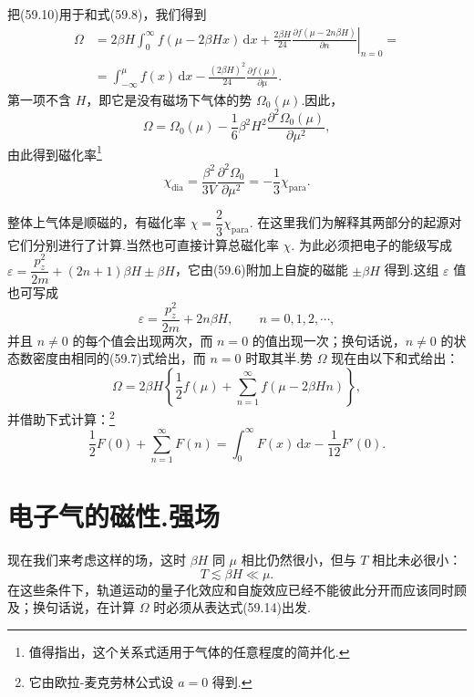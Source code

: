 把(59.10)用于和式(59.8)，我们得到
\begin{equation*}
\begin{aligned}
  \Omega&=2\beta H\int_0^{\infty}f(\mu-2\beta Hx)\,\mathrm{d}x
  +\frac{2\beta H}{24}\left.\frac{\partial f(\mu-2n\beta H)}{\partial n}\right|_{n=0}=\\
  &=\int_{-\infty}^{\mu}f(x)\,\mathrm{d}x
  -\frac{(2\beta H)^2}{24}\frac{\partial f(\mu)}{\partial\mu}.
\end{aligned}
\end{equation*}
第一项不含 $H$，即它是没有磁场下气体的势 $\Omega_0(\mu)$.因此，
\begin{equation}
  \Omega=\Omega_0(\mu)-\frac{1}{6}\beta^2H^2
  \frac{\partial^2\Omega_0(\mu)}{\partial\mu^2},
\end{equation}
由此得到磁化率\footnote{值得指出，这个关系式适用于气体的任意程度的简并化.}
\begin{equation}
  \chi_{\mathrm{dia}}=\frac{\beta^2}{3V}\frac{\partial^2\Omega_0}{\partial\mu^2}
  =-\frac{1}{3}\chi_{\mathrm{para}}.
\end{equation}

整体上气体是顺磁的，有磁化率 $\chi=\dfrac{2}{3}\chi_{\mathrm{para}}$. 在这里我们为解释其两部分的起源对它们分别进行了计算.当然也可直接计算总磁化率 $\chi$. 为此必须把电子的能级写成 $\varepsilon=\dfrac{p_z^2}{2m}+(2n+1)\beta H\pm\beta H$，它由(59.6)附加上自旋的磁能 $\pm\beta H$ 得到.这组 $\varepsilon$ 值也可写成
\begin{equation}
  \varepsilon=\frac{p_z^2}{2m}+2n\beta H,\qquad n=0,1,2,\cdots,
\end{equation}
并且 $n\neq0$ 的每个值会出现两次，而 $n=0$ 的值出现一次；换句话说，$n\neq0$ 的状态数密度由相同的(59.7)式给出，而 $n=0$ 时取其半.势 $\Omega$ 现在由以下和式给出：
\begin{equation}
  \Omega=2\beta H\left\{\frac{1}{2}f(\mu)+\sum_{n=1}^{\infty}f(\mu-2\beta Hn)\right\},
\end{equation}
并借助下式计算：\footnote{它由欧拉-麦克劳林公式设 $a=0$ 得到.}
\begin{equation}
  \frac{1}{2}F(0)+\sum_{n=1}^{\infty}F(n)=\int_0^{\infty}F(x)\,\mathrm{d}x
  -\frac{1}{12}F'(0).
\end{equation}

\section{电子气的磁性.强场}

现在我们来考虑这样的场，这时 $\beta H$ 同 $\mu$ 相比仍然很小，但与 $T$ 相比未必很小：
\begin{equation}
  T\lesssim\beta H\ll\mu.
\end{equation}
在这些条件下，轨道运动的量子化效应和自旋效应已经不能彼此分开而应该同时顾及；换句话说，在计算 $\Omega$ 时必须从表达式(59.14)出发.

